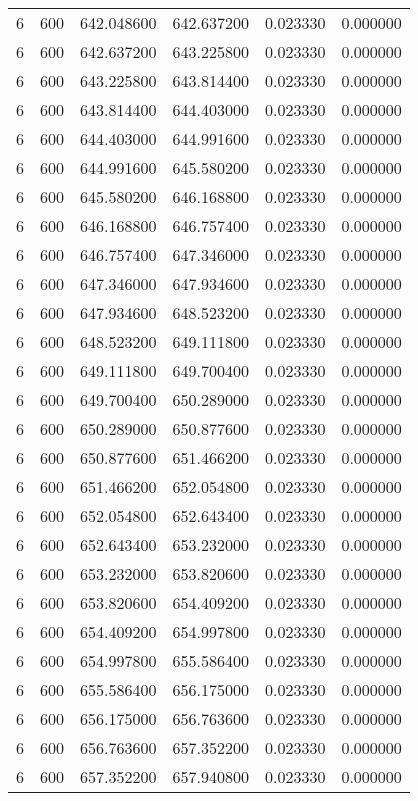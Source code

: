 \begin{longtable}{rrrrrr}
6 & 600 & 642.048600 & 642.637200 & 0.023330 & 0.000000 \\
6 & 600 & 642.637200 & 643.225800 & 0.023330 & 0.000000 \\
6 & 600 & 643.225800 & 643.814400 & 0.023330 & 0.000000 \\
6 & 600 & 643.814400 & 644.403000 & 0.023330 & 0.000000 \\
6 & 600 & 644.403000 & 644.991600 & 0.023330 & 0.000000 \\
6 & 600 & 644.991600 & 645.580200 & 0.023330 & 0.000000 \\
6 & 600 & 645.580200 & 646.168800 & 0.023330 & 0.000000 \\
6 & 600 & 646.168800 & 646.757400 & 0.023330 & 0.000000 \\
6 & 600 & 646.757400 & 647.346000 & 0.023330 & 0.000000 \\
6 & 600 & 647.346000 & 647.934600 & 0.023330 & 0.000000 \\
6 & 600 & 647.934600 & 648.523200 & 0.023330 & 0.000000 \\
6 & 600 & 648.523200 & 649.111800 & 0.023330 & 0.000000 \\
6 & 600 & 649.111800 & 649.700400 & 0.023330 & 0.000000 \\
6 & 600 & 649.700400 & 650.289000 & 0.023330 & 0.000000 \\
6 & 600 & 650.289000 & 650.877600 & 0.023330 & 0.000000 \\
6 & 600 & 650.877600 & 651.466200 & 0.023330 & 0.000000 \\
6 & 600 & 651.466200 & 652.054800 & 0.023330 & 0.000000 \\
6 & 600 & 652.054800 & 652.643400 & 0.023330 & 0.000000 \\
6 & 600 & 652.643400 & 653.232000 & 0.023330 & 0.000000 \\
6 & 600 & 653.232000 & 653.820600 & 0.023330 & 0.000000 \\
6 & 600 & 653.820600 & 654.409200 & 0.023330 & 0.000000 \\
6 & 600 & 654.409200 & 654.997800 & 0.023330 & 0.000000 \\
6 & 600 & 654.997800 & 655.586400 & 0.023330 & 0.000000 \\
6 & 600 & 655.586400 & 656.175000 & 0.023330 & 0.000000 \\
6 & 600 & 656.175000 & 656.763600 & 0.023330 & 0.000000 \\
6 & 600 & 656.763600 & 657.352200 & 0.023330 & 0.000000 \\
6 & 600 & 657.352200 & 657.940800 & 0.023330 & 0.000000 \\

\end{longtable}

